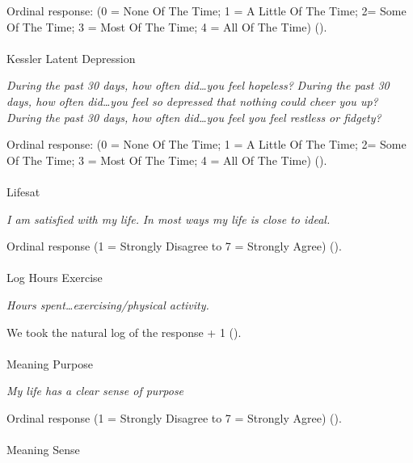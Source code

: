 \documentclass[
  single column]{article}
\makeatletter
\let\oldparagraph\paragraph
\renewcommand{\paragraph}{
    \@ifstar
      \xxxParagraphStar
      \xxxParagraphNoStar
  }
\newcommand{\xxxParagraphStar}[1]{\oldparagraph*{#1}\mbox{}}
\newcommand{\xxxParagraphNoStar}[1]{\oldparagraph{#1}\mbox{}}
\makeatother
\begin{document}
Ordinal response: (0 = None Of The Time; 1 = A Little Of The Time; 2=
Some Of The Time; 3 = Most Of The Time; 4 = All Of The Time)
().

\paragraph{Kessler Latent Depression}\label{kessler-latent-depression}

\emph{During the past 30 days, how often did\ldots you feel hopeless?}
\emph{During the past 30 days, how often did\ldots you feel so depressed
that nothing could cheer you up?} \emph{During the past 30 days, how
often did\ldots you feel you feel restless or fidgety?}

Ordinal response: (0 = None Of The Time; 1 = A Little Of The Time; 2=
Some Of The Time; 3 = Most Of The Time; 4 = All Of The Time)
().

\paragraph{Lifesat}\label{lifesat}

\emph{I am satisfied with my life.} \emph{In most ways my life is close
to ideal.}

Ordinal response (1 = Strongly Disagree to 7 = Strongly Agree)
().

\paragraph{Log Hours Exercise}\label{log-hours-exercise}

\emph{Hours spent\ldots exercising/physical activity.}

We took the natural log of the response + 1
().

\paragraph{Meaning Purpose}\label{meaning-purpose}

\emph{My life has a clear sense of purpose}

Ordinal response (1 = Strongly Disagree to 7 = Strongly Agree)
().

\paragraph{Meaning Sense}\label{meaning-sense}
\end{document}
